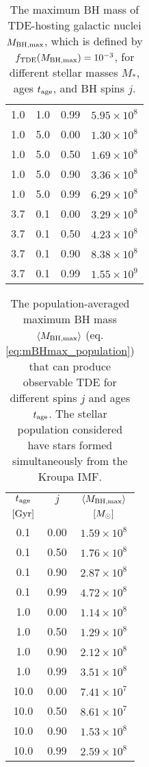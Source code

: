 \documentclass[useAMS,usenatbib]{mn2e}
\def\msun{M_{\rm \odot}}
\def\mstar{M_*}
\def\mBHmax{M_{\rm BH,\max}}
\def\fTDE{f_{\rm TDE}}
\def\tage{t_{\rm age}}
\def\Gyr{{\rm Gyr}}
\newcommand{\lara}[1]{\left\langle{#1}\right\rangle}
\begin{document}
\begin{table}
\begin{tabular}{cccc}
           1.0 &   1.0 & 0.99 & $5.95\times10^8$ \\
           1.0 &   5.0 & 0.00 & $1.30\times10^8$ \\
           1.0 &   5.0 & 0.50 & $1.69\times10^8$ \\
           1.0 &   5.0 & 0.90 & $3.36\times10^8$ \\
           1.0 &   5.0 & 0.99 & $6.29\times10^8$ \\
           3.7 &   0.1 & 0.00 & $3.29\times10^8$ \\
           3.7 &   0.1 & 0.50 & $4.23\times10^8$ \\
           3.7 &   0.1 & 0.90 & $8.38\times10^8$ \\
           3.7 &   0.1 & 0.99 & $1.55\times10^9$ \\
        \hline
    \end{tabular}
    \caption{
    The maximum BH mass of TDE-hosting galactic nuclei $\mBHmax$, which is defined by $\fTDE(\mBHmax)=10^{-3}$, for different stellar masses $\mstar$, ages $\tage$, and BH spins $j$.
    }
    \label{tab:mBHmax}
\end{table}

\begin{table}
    \centering
    \begin{tabular}{ccc}
    \hline
    $\tage$ & $j$ & $\lara{\mBHmax}$ \\
    $[\Gyr]$ & & $[\msun]$ \\
    \hline
      0.1 & 0.00 & $1.59\times10^8$ \\
      0.1 & 0.50 & $1.76\times10^8$ \\
      0.1 & 0.90 & $2.87\times10^8$ \\
      0.1 & 0.99 & $4.72\times10^8$ \\
      1.0 & 0.00 & $1.14\times10^8$ \\
      1.0 & 0.50 & $1.29\times10^8$ \\
      1.0 & 0.90 & $2.12\times10^8$ \\
      1.0 & 0.99 & $3.51\times10^8$ \\
     10.0 & 0.00 & $7.41\times10^7$ \\
     10.0 & 0.50 & $8.61\times10^7$ \\
     10.0 & 0.90 & $1.53\times10^8$ \\
     10.0 & 0.99 & $2.59\times10^8$ \\
     \hline
    \end{tabular}
    \caption{
    The population-averaged maximum BH mass $\lara{\mBHmax}$ (eq. \ref{eq:mBHmax_population}) that can produce observable TDE for different spins $j$ and ages $\tage$. The stellar population considered have stars formed simultaneously from the Kroupa IMF.
    }
    \label{tab:mBHmax_population}
\end{table}
\end{document}
